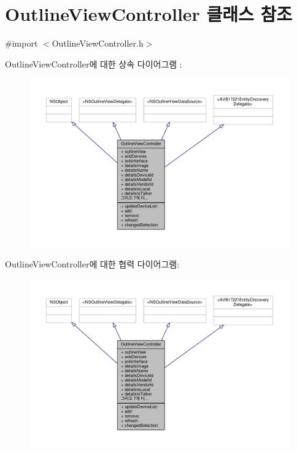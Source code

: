 \hypertarget{interface_outline_view_controller}{}\section{Outline\+View\+Controller 클래스 참조}
\label{interface_outline_view_controller}


{\ttfamily \#import $<$Outline\+View\+Controller.\+h$>$}



Outline\+View\+Controller에 대한 상속 다이어그램 \+: 
\nopagebreak
\begin{figure}[H]
\begin{center}
\leavevmode
\includegraphics[width=350pt]{interface_outline_view_controller__inherit__graph}
\end{center}
\end{figure}


Outline\+View\+Controller에 대한 협력 다이어그램\+:
\nopagebreak
\begin{figure}[H]
\begin{center}
\leavevmode
\includegraphics[width=350pt]{interface_outline_view_controller__coll__graph}
\end{center}
\end{figure}
